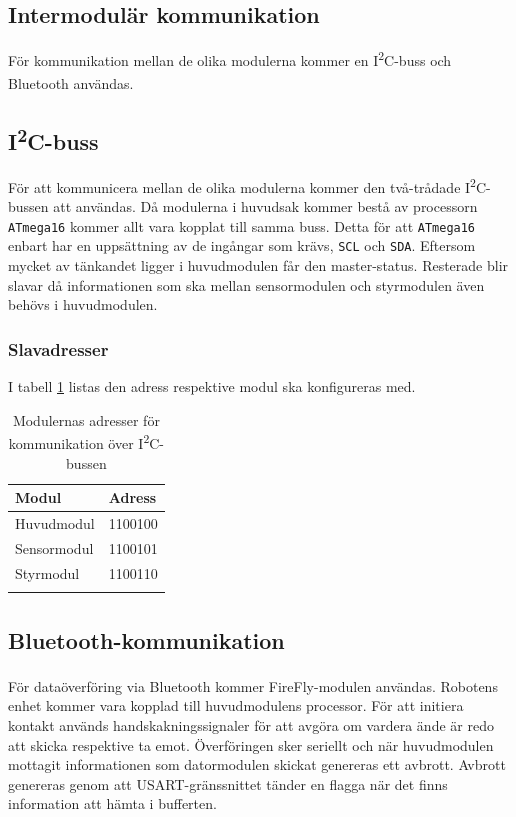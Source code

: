 \documentclass[11pt]{article}
\begin{document}
\begin{flushleft}
\pagebreak
\section{Intermodulär kommunikation}\label{Intermodulär kommunikation}
För kommunikation mellan de olika modulerna kommer en I\textsuperscript{2}C-buss och Bluetooth\textsuperscript{\circledR} användas. 

\subsection{I\textsuperscript{2}C-buss}

För att kommunicera mellan de olika modulerna kommer den två-trådade I\textsuperscript{2}C-bussen att användas. Då modulerna i huvudsak kommer bestå av processorn \verb+ATmega16+ kommer allt vara kopplat till samma buss. Detta för att \verb+ATmega16+ enbart har en uppsättning av de ingångar som krävs, \verb+SCL+ och \verb+SDA+. Eftersom mycket av tänkandet ligger i huvudmodulen får den master-status. Resterade blir slavar då informationen som ska mellan sensormodulen och styrmodulen även behövs i huvudmodulen.

\subsubsection{Slavadresser}
I tabell \ref{slavAdress} listas den adress respektive modul ska konfigureras med. 

\begin{center}
\begin{longtable}{|l|l|} \hline
\textbf{Modul} & \textbf{Adress}\\ \hline 
Huvudmodul & 1100100 \\ \hline
Sensormodul & 1100101 \\ \hline
Styrmodul & 1100110\\ \hline
\caption{Modulernas adresser för kommunikation över I\textsuperscript{2}C-bussen}
\label{slavAdress}
\end{longtable}
\end{center}

\subsection{Bluetooth\textsuperscript{\circledR}-kommunikation}
För dataöverföring via Bluetooth\textsuperscript{\circledR} kommer FireFly-modulen användas. Robotens enhet kommer vara kopplad till huvudmodulens processor. För att initiera kontakt används handskakningssignaler för att avgöra om vardera ände är redo att skicka respektive ta emot. Överföringen sker seriellt och när huvudmodulen mottagit informationen som datormodulen skickat genereras ett avbrott. Avbrott genereras genom att USART-gränssnittet tänder en flagga när det finns information att hämta i bufferten.
 


\end{flushleft}
\end{document}
